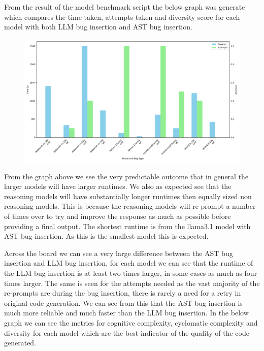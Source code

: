 \documentclass[12pt]{extarticle}
\begin{document}
From the result of the model benchmark script the below graph was generate which compares the time taken, attempts taken and diversity score for each model with both LLM bug insertion and AST bug insertion.
\begin{figure}[h!]
\centering
\includegraphics[width=\linewidth]{Images/Model_Comparison_Fibbonaci.png}
\label{fig:Model_Benchmark}
\end{figure}

From the graph above we see the very predictable outcome that in general the larger models will have larger runtimes. We also as expected see that the reasoning models will have substantially longer runtimes then equally sized non reasoning models. This is because the reasoning models will re-prompt a number of times over to try and improve the response as much as possible before providing a final output. The shortest runtime is from the llama3.1 model with AST bug insertion. As this is the smallest model this is expected. 

Across the board we can see a very large difference between the AST bug insertion and LLM bug insertion, for each model we can see that the runtime of the LLM bug insertion is at least two times larger, in some cases as much as four times larger. The same is seen for the attempts needed as the vast majority of the re-prompts are during the bug insertion, there is rarely a need for a retry in original code generation. We can see from this that the AST bug insertion is much more reliable and much faster than the LLM bug insertion. In the below graph we can see the metrics for cognitive complexity, cyclomatic complexity and diversity for each model which are the best indicator of the quality of the code generated.
\end{document}
